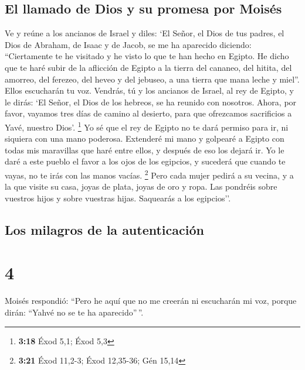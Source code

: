 \hypertarget{el-llamado-de-dios-y-su-promesa-por-moisuxe9s}{%
\subsection{El llamado de Dios y su promesa por
Moisés}\label{el-llamado-de-dios-y-su-promesa-por-moisuxe9s}}

 Ve y reúne a los ancianos de Israel y diles: `El Señor,
el Dios de tus padres, el Dios de Abraham, de Isaac y de Jacob, se me ha
aparecido diciendo: ``Ciertamente te he visitado y he visto lo que te
han hecho en Egipto.  He dicho que te haré subir de la
aflicción de Egipto a la tierra del cananeo, del hitita, del amorreo,
del ferezeo, del heveo y del jebuseo, a una tierra que mana leche y
miel''.  Ellos escucharán tu voz. Vendrás, tú y los
ancianos de Israel, al rey de Egipto, y le dirás: `El Señor, el Dios de
los hebreos, se ha reunido con nosotros. Ahora, por favor, vayamos tres
días de camino al desierto, para que ofrezcamos sacrificios a Yavé,
nuestro Dios'. \footnote{\textbf{3:18} Éxod 5,1; Éxod 5,3}
 Yo sé que el rey de Egipto no te dará permiso para ir,
ni siquiera con una mano poderosa.  Extenderé mi mano y
golpearé a Egipto con todas mis maravillas que haré entre ellos, y
después de eso los dejará ir.  Yo le daré a este pueblo
el favor a los ojos de los egipcios, y sucederá que cuando te vayas, no
te irás con las manos vacías. \footnote{\textbf{3:21} Éxod 11,2-3; Éxod
  12,35-36; Gén 15,14}  Pero cada mujer pedirá a su
vecina, y a la que visite su casa, joyas de plata, joyas de oro y ropa.
Las pondréis sobre vuestros hijos y sobre vuestras hijas. Saquearás a
los egipcios''.

\hypertarget{los-milagros-de-la-autenticaciuxf3n}{%
\subsection{Los milagros de la
autenticación}\label{los-milagros-de-la-autenticaciuxf3n}}

\hypertarget{section-3}{%
\section{4}\label{section-3}}

 Moisés respondió: ``Pero he aquí que no me creerán ni
escucharán mi voz, porque dirán: ``Yahvé no se te ha aparecido''\,''.

